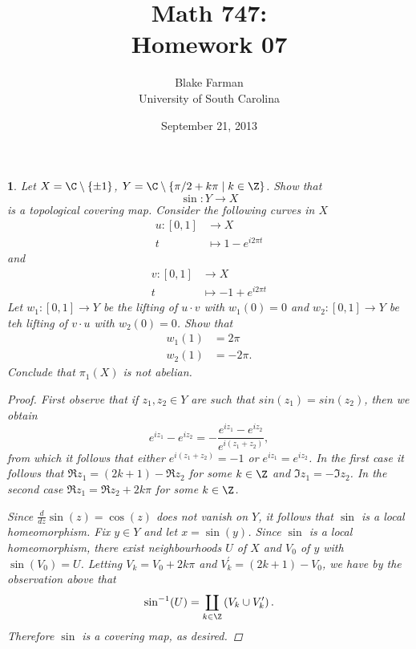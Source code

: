 \documentclass[10pt]{amsart}
\author{Blake Farman\\University of South Carolina}
\title{Math 747:\\Homework 07}
\date{September 21, 2013}
\begin{document}
\maketitle

\providecommand{\p}{\mathfrak{p}}
\providecommand{\m}{\mathfrak{m}}

\newtheorem{thm}{}
\newtheorem{lem}{Lemma}
\newtheorem{prop}{Proposition}
\theoremstyle{definition}
\newtheorem{defn}{Definition}[thm]

\newcommand{\A}{\mathbb{A}}

\begin{thm}
  Let $X = \C \setminus \left\{ \pm 1\right\}$, $Y = \C \setminus \left\{\pi/2 + k\pi \;\middle\vert\; k \in \Z\right\}$.
  Show that 
  $$\sin \colon Y \rightarrow X$$
  is a topological covering map.
  Consider the following curves in $X$
  \begin{align*}
    u \colon [0,1] &\rightarrow X\\
    t &\mapsto 1 - e^{i2\pi t}
  \end{align*}
  and
  \begin{align*}
    v \colon [0,1] &\rightarrow X\\
    t &\mapsto -1 + e^{i2\pi t}
  \end{align*} 
  Let $w_1 \colon [0,1] \rightarrow Y$ be the lifting of $u \cdot v$ with $w_1(0) = 0$ and $w_2 \colon [0,1] \rightarrow Y$ be teh lifting of $v \cdot u$ with $w_2(0) = 0$.
  Show that
  \begin{align*}
    w_1(1) &= 2\pi\\
    w_2(1) &= -2\pi.
  \end{align*}
  Conclude that $\pi_1(X)$ is not abelian.

  \begin{proof}
    First observe that if $z_1, z_2 \in Y$ are such that $sin(z_1) = sin(z_2)$, then we obtain 
    $$e^{iz_1} - e^{iz_2} = -\frac{e^{iz_1} - e^{iz_2}}{e^{i(z_1 + z_2)}},$$
    from which it follows that either $e^{i(z_1 + z_2)} = -1$ or $e^{iz_1} = e^{iz_2}$.
    In the first case it follows that $\Re{z_1} = (2k + 1) - \Re{z_2}$ for some $k \in \Z$ and $\Im{z_1} = -\Im{z_2}$.
    In the second case $\Re{z_1} = \Re{z_2} + 2k\pi$ for some $k \in \Z$.
    
    Since $\frac{d}{dz} \sin(z) = \cos(z)$ does not vanish on $Y$, it follows that $\sin$ is a local homeomorphism.
    Fix $y \in Y$ and let $x = \sin(y)$.
    Since $\sin$ is a local homeomorphism, there exist neighbourhoods $U$ of $X$ and $V_0$ of $y$ with $\sin(V_0) = U$.
    Letting $V_k = V_0 + 2k\pi$ and $V_k^\prime = (2k + 1) - V_0$, we have by the observation above that
    $$\sin^{-1}(U) = \coprod_{k \in \Z} \left( V_k \cup V_k^\prime \right).$$
    Therefore $\sin$ is a covering map, as desired.


\end{proof}
\end{thm}
\end{document}
